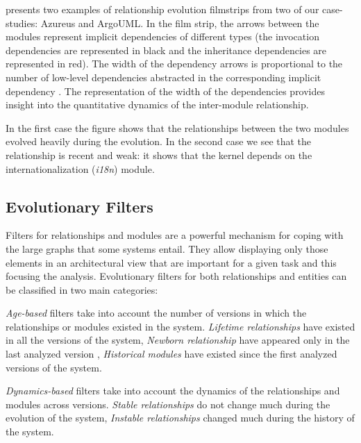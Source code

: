 \documentclass[preprint,12pt]{elsarticle}
\begin{document}
 presents two examples of relationship evolution filmstrips from two of our case-studies: Azureus and ArgoUML. In the film strip, the arrows between the modules represent implicit dependencies of different types (the invocation dependencies are represented in black and the inheritance dependencies are represented in red). The width of the dependency arrows is proportional to the number of low-level dependencies abstracted in the corresponding implicit dependency \cite{lungu-relevo}. The representation of the width of the dependencies provides insight into the quantitative dynamics of the inter-module relationship.

In the first case the figure shows that the relationships between the two modules evolved heavily during the evolution. In the second case we see that the relationship is recent and weak: it shows that the kernel depends on the internationalization ({\em i18n}) module. 

\subsection {Evolutionary Filters}

Filters for relationships and modules are a powerful mechanism for coping with the large graphs that some systems entail. They allow displaying only those elements in an architectural view that are important for a given task and this focusing the analysis. Evolutionary filters for both relationships and entities can be classified in two main categories:

\begin{description}
\item {\em Age-based} filters take into account the number of versions in which the relationships or modules existed in the system. {\em Lifetime relationships} have existed in all the versions of the system, {\em Newborn relationship} have appeared only in the last analyzed version \cite{lungu-relevo}, {\em Historical modules} have existed since the first analyzed versions of the system.
\item {\em Dynamics-based} filters take into account the dynamics of the relationships and modules across versions. {\em Stable relationships} do not change much during the evolution of the system, {\em Instable relationships} changed much during the history of the system.
\end{description}
\end{document}
